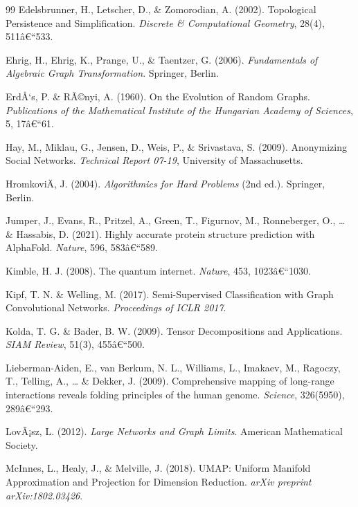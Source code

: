 ﻿\documentclass[12pt,a4paper,twoside]{article}
\theoremstyle{definition}
\theoremstyle{plain}
\theoremstyle{remark}
\begin{document}
\begin{thebibliography}{99}
  Edelsbrunner, H., Letscher, D., \& Zomorodian, A. (2002).
  Topological Persistence and Simplification.
  \textit{Discrete \& Computational Geometry}, 28(4), 511â€“533.

  Ehrig, H., Ehrig, K., Prange, U., \& Taentzer, G. (2006).
  \textit{Fundamentals of Algebraic Graph Transformation}.
  Springer, Berlin.

  ErdÅ‘s, P. \& RÃ©nyi, A. (1960).
  On the Evolution of Random Graphs.
  \textit{Publications of the Mathematical Institute of the Hungarian
  Academy of Sciences}, 5, 17â€“61.

  Hay, M., Miklau, G., Jensen, D., Weis, P., \& Srivastava, S. (2009).
  Anonymizing Social Networks.
  \textit{Technical Report 07-19}, University of Massachusetts.

  HromkoviÄ, J. (2004).
  \textit{Algorithmics for Hard Problems} (2nd ed.).
  Springer, Berlin.

  Jumper, J., Evans, R., Pritzel, A., Green, T., Figurnov, M.,
  Ronneberger, O., \ldots{} \& Hassabis, D. (2021).
  Highly accurate protein structure prediction with AlphaFold.
  \textit{Nature}, 596, 583â€“589.

  Kimble, H. J. (2008).
  The quantum internet.
  \textit{Nature}, 453, 1023â€“1030.

  Kipf, T. N. \& Welling, M. (2017).
  Semi-Supervised Classification with Graph Convolutional Networks.
  \textit{Proceedings of ICLR 2017}.

  Kolda, T. G. \& Bader, B. W. (2009).
  Tensor Decompositions and Applications.
  \textit{SIAM Review}, 51(3), 455â€“500.

  Lieberman-Aiden, E., van Berkum, N. L., Williams, L., Imakaev, M.,
  Ragoczy, T., Telling, A., \ldots{} \& Dekker, J. (2009).
  Comprehensive mapping of long-range interactions reveals folding
  principles of the human genome.
  \textit{Science}, 326(5950), 289â€“293.

  LovÃ¡sz, L. (2012).
  \textit{Large Networks and Graph Limits}.
  American Mathematical Society.

  McInnes, L., Healy, J., \& Melville, J. (2018).
  UMAP: Uniform Manifold Approximation and Projection for Dimension
  Reduction.
  \textit{arXiv preprint arXiv:1802.03426}.


\end{thebibliography}
\end{document}
